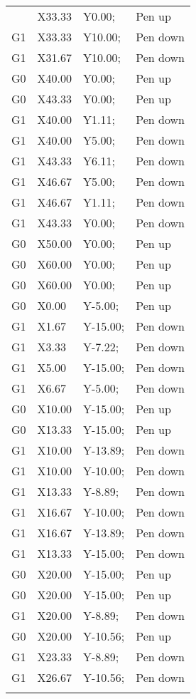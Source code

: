 \begin{longtable}{|>{\raggedright\arraybackslash}m{}|>{\raggedright\arraybackslash}m{}|>{\raggedright\arraybackslash}m{}|>{\raggedright\arraybackslash}m{}|}
\begin{array}{cccl}
        G0 &X33.33 &Y0.00;   &Pen up\\
        G1 &X33.33 &Y10.00;  &Pen down\\
        G1 &X31.67 &Y10.00;  &Pen down\\
        G0 &X40.00 &Y0.00;   &Pen up\\
        G0 &X43.33 &Y0.00;   &Pen up\\
        G1 &X40.00 &Y1.11;   &Pen down\\
        G1 &X40.00 &Y5.00;   &Pen down\\
        G1 &X43.33 &Y6.11;   &Pen down\\
        G1 &X46.67 &Y5.00;   &Pen down\\
        G1 &X46.67 &Y1.11;   &Pen down\\
        G1 &X43.33 &Y0.00;   &Pen down\\
        G0 &X50.00 &Y0.00;   &Pen up\\
        G0 &X60.00 &Y0.00;   &Pen up\\
        G0 &X60.00 &Y0.00;   &Pen up\\
        G0 &X0.00  &Y-5.00;  &Pen up\\
        G1 &X1.67  &Y-15.00; &Pen down\\
        G1 &X3.33  &Y-7.22;  &Pen down\\
        G1 &X5.00  &Y-15.00; &Pen down\\
        G1 &X6.67  &Y-5.00;  &Pen down\\
        G0 &X10.00 &Y-15.00; &Pen up\\
        G0 &X13.33 &Y-15.00; &Pen up\\
        G1 &X10.00 &Y-13.89; &Pen down\\
        G1 &X10.00 &Y-10.00; &Pen down\\
        G1 &X13.33 &Y-8.89;  &Pen down\\
        G1 &X16.67 &Y-10.00; &Pen down\\
        G1 &X16.67 &Y-13.89; &Pen down\\
        G1 &X13.33 &Y-15.00; &Pen down\\
        G0 &X20.00 &Y-15.00; &Pen up\\
        G0 &X20.00 &Y-15.00; &Pen up\\
        G1 &X20.00 &Y-8.89;  &Pen down\\
        G0 &X20.00 &Y-10.56; &Pen up\\
        G1 &X23.33 &Y-8.89;  &Pen down\\
        G1 &X26.67 &Y-10.56; &Pen down\\

\end{array}
\end{longtable}
